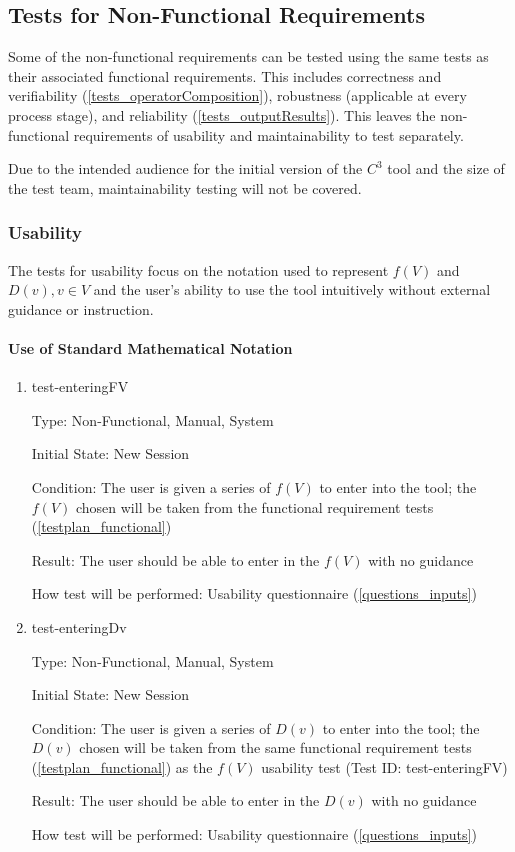 \documentclass[12pt, titlepage]{article}
\newcommand{\prognameAbbrv}{$C^{3}$}
\begin{document}
\subsection{Tests for Non-Functional Requirements}
\label{testplan_nonfunctional}

Some of the non-functional requirements can be tested using the same tests as 
their associated functional requirements. This includes correctness 
and verifiability (\ref{tests_operatorComposition}), robustness (applicable at 
every process stage), and reliability (\ref{tests_outputResults}). This leaves 
the non-functional requirements of usability and maintainability to test 
separately. 

Due to the intended audience for the initial version of the \prognameAbbrv{} 
tool and the size of the test team, maintainability testing will not be covered.

\subsubsection{Usability}
\label{tests_nonfunctional_usability}
The tests for usability focus on the notation used to represent $f(V)$ and 
$D(v), v \in V$ and the user's ability to use the tool intuitively without 
external guidance or instruction.
		
\paragraph{Use of Standard Mathematical Notation}

\begin{enumerate}

\item{test-enteringFV}

Type: Non-Functional, Manual, System
					
Initial State: New Session
					
Condition: The user is given a series of $f(V)$ to enter into the tool; the 
$f(V)$ chosen will be taken from the functional requirement tests 
(\ref{testplan_functional})
					
Result: The user should be able to enter in the $f(V)$ with no guidance
					
How test will be performed: Usability questionnaire (\ref{questions_inputs})\\
					
\item{test-enteringDv}

Type: Non-Functional, Manual, System
					
Initial State: New Session
					
Condition: The user is given a series of $D(v)$ to enter into the tool; the 
$D(v)$ chosen will be taken from the same functional requirement tests 
(\ref{testplan_functional}) as the $f(V)$ usability test (Test ID: 
test-enteringFV)
					
Result: The user should be able to enter in the $D(v)$ with no guidance
					
How test will be performed: Usability questionnaire (\ref{questions_inputs})\\

\end{enumerate}
\end{document}
